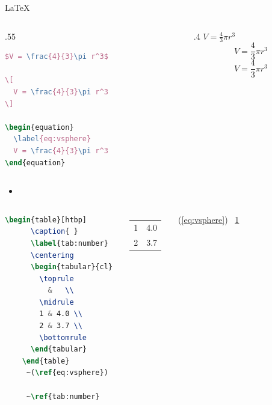 \documentclass{article}
\begin{document}
\begin{frame}[fragile]{\LaTeX{}  }
    \begin{columns}
        \begin{column}{.55\textwidth}
\begin{lstlisting}[language=TeX]
$V = \frac{4}{3}\pi r^3$

\[
  V = \frac{4}{3}\pi r^3
\]

\begin{equation}
  \label{eq:vsphere}
  V = \frac{4}{3}\pi r^3
\end{equation}
\end{lstlisting}
        \end{column}
        \begin{column}{.4\textwidth}
            $V = \frac{4}{3}\pi r^3$
            \[
                V = \frac{4}{3}\pi r^3
            \]
            \begin{equation}
                \label{eq:vsphere}
                V = \frac{4}{3}\pi r^3
            \end{equation}
        \end{column}
    \end{columns}
    \begin{itemize}
        \item   \href{https://zh.wikipedia.org/wiki/Help: }{\color{purple}{ }}
    \end{itemize}
\end{frame}

\begin{frame}[fragile]
    \begin{columns}
\begin{lstlisting}[language=TeX]
    \begin{table}[htbp]
      \caption{ }
      \label{tab:number}
      \centering
      \begin{tabular}{cl}
        \toprule
          &   \\
        \midrule
        1 & 4.0 \\
        2 & 3.7 \\
        \bottomrule
      \end{tabular}
    \end{table}
     ~(\ref{eq:vsphere})  
     
     ~\ref{tab:number} 
\end{lstlisting}
        \begin{table}[htpb]
            \centering
            \caption{ }
            \label{tab:number}
            \begin{tabular}{cl}\toprule
                  &   \\\midrule
                1 & 4.0\\
                2 & 3.7\\\bottomrule
            \end{tabular}
        \end{table}
        \normalsize  ~(\ref{eq:vsphere}) ~\ref{tab:number} 
    \end{columns}
\end{frame}
\end{document}

